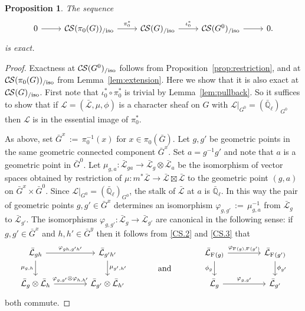 \documentclass[10pt]{amsart}
\theoremstyle{plain}
\newtheorem{proposition}[theorem]{Proposition}
\theoremstyle{definition}
\theoremstyle{remark}
\newcommand{\EE}{\mathbb{\bar Q}_\ell}
\newcommand{\Frob}[1]{\operatorname{F}_{#1}}
\newcommand{\ceq}{{\, :=\, }}
\newcommand{\cs}[1]{{\mathcal{#1}}}
\newcommand{\gcs}[1]{{\mathcal{\bar #1}}}
\newcommand{\CS}{{\mathcal{C\hskip-0.8pt S}}}
\newcommand{\CSiso}[1]{\CS(#1)_{/\text{iso}}}
\newcommand{\bG}{\bar{G}}
\begin{document}
\begin{proposition}\label{prop:middleexact}
 The sequence
 \[
  \begin{tikzcd}
  0 \rar & \CSiso{\pi_0(G)} \arrow{r}{\pi_0^*} & \CSiso{G} \arrow{r}{\iota_0^*} & \CSiso{G^0} \rar & 0.
  \end{tikzcd}
 \]
 is exact.
\end{proposition}

\begin{proof}
Exactness at $\CSiso{G^0}$ follows from Proposition~\ref{prop:restriction},
and at $\CSiso{\pi_0(G)}$ from Lemma~\ref{lem:extension}.
Here we show that it is also exact at $\CSiso{G}$.
First note that $\iota_0^* \circ \pi_0^*$ is trivial by Lemma~\ref{lem:pullback}.
So it suffices to show that if $\cs{L} = (\gcs{L},\mu,\phi)$ is a character sheaf on $G$
with $\cs{L}\vert_{G^0} = (\EE)_{G^0}$ then $\cs{L}$ is in the essential image of $\pi_0^*$.

As above, set $\bG^x \ceq \pi_0^{-1}(x)$ for $x\in \pi_0(\bG)$.
Let $g, g'$ be geometric points in the same
geometric connected component $\bG^x$.
Set $a = g^{-1}g'$ and note that $a$ is a geometric point in $\bG^0$.
Let $\mu_{g,a} : \gcs{L}_{ga} \to \gcs{L}_g \otimes \gcs{L}_a$
be the isomorphism of vector spaces obtained by restriction of
$\mu : m^*\gcs{L} \to \gcs{L} \boxtimes \gcs{L}$ to the
geometric point $(g,a)$ on $\bG^x \times \bG^0$.
Since $\cs{L}\vert_{G^0} = (\EE)_{G^0}$,
the stalk of $\gcs{L}$ at $a$ is $\EE$.
In this way the pair of geometric points $g, g' \in \bG^x$
determines an isomorphism $\varphi_{g,g'} \ceq \mu_{g,a}^{-1}$
from $\gcs{L}_{g}$ to $\gcs{L}_{g'}$.
%
The isomorphisms $\varphi_{g,g'}: \gcs{L}_{g} \to \gcs{L}_{g'}$ are canonical
in the following sense: if $g,g'\in \bG^x$ and $h,h'\in \bG^y$
then it follows from \ref{CS.2} and \ref{CS.3}
that
 \begin{equation}\label{eq:CS}
  \begin{tikzcd}[column sep=40]
   \gcs{L}_{gh} \arrow{r}{\varphi_{gh,g'h'}} \arrow[swap]{d}{\mu_{g,h}}
  & \gcs{L}_{g'h'} \arrow{d}{\mu_{g',h'}}
  &\arrow[draw=none]{d}[pos=.4,description]{\text{\normalsize{and}}}
  &  \gcs{L}_{\Frob{}(g)} \arrow{r}{\varphi_{\Frob{}(g),\Frob{}(g')}} \arrow[swap]{d}{\phi_{g}} & \gcs{L}_{\Frob{}(g')} \arrow{d}{\phi_{g'}} \\
  \gcs{L}_{g} \otimes \gcs{L}_{h} \arrow{r}{\varphi_{g,g'}\otimes \varphi_{h,h'}}
  & \gcs{L}_{g'} \otimes \gcs{L}_{h'}
  & {}
  & \gcs{L}_{g} \arrow{r}{\varphi_{g,g'}} & \gcs{L}_{g'}
  \end{tikzcd}
 \end{equation}
both commute.


\end{proof}
\end{document}
